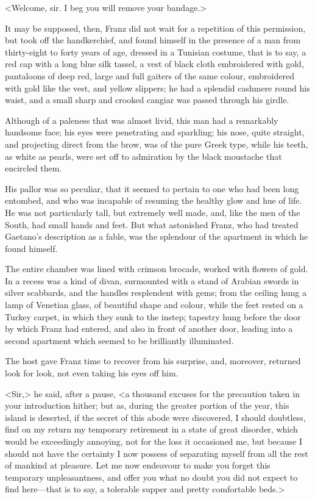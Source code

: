  <Welcome, sir. I beg you will remove your bandage.> 

 It may be supposed, then, Franz did not wait for a repetition of this permission, but took off the handkerchief, and found himself in the presence of a man from thirty-eight to forty years of age, dressed in a Tunisian costume, that is to say, a red cap with a long blue silk tassel, a vest of black cloth embroidered with gold, pantaloons of deep red, large and full gaiters of the same colour, embroidered with gold like the vest, and yellow slippers; he had a splendid cashmere round his waist, and a small sharp and crooked cangiar was passed through his girdle. 

 Although of a paleness that was almost livid, this man had a remarkably handsome face; his eyes were penetrating and sparkling; his nose, quite straight, and projecting direct from the brow, was of the pure Greek type, while his teeth, as white as pearls, were set off to admiration by the black moustache that encircled them. 

 His pallor was so peculiar, that it seemed to pertain to one who had been long entombed, and who was incapable of resuming the healthy glow and hue of life. He was not particularly tall, but extremely well made, and, like the men of the South, had small hands and feet. But what astonished Franz, who had treated Gaetano's description as a fable, was the splendour of the apartment in which he found himself. 

 The entire chamber was lined with crimson brocade, worked with flowers of gold. In a recess was a kind of divan, surmounted with a stand of Arabian swords in silver scabbards, and the handles resplendent with gems; from the ceiling hung a lamp of Venetian glass, of beautiful shape and colour, while the feet rested on a Turkey carpet, in which they sunk to the instep; tapestry hung before the door by which Franz had entered, and also in front of another door, leading into a second apartment which seemed to be brilliantly illuminated. 

 The host gave Franz time to recover from his surprise, and, moreover, returned look for look, not even taking his eyes off him. 

 <Sir,> he said, after a pause, <a thousand excuses for the precaution taken in your introduction hither; but as, during the greater portion of the year, this island is deserted, if the secret of this abode were discovered, I should doubtless, find on my return my temporary retirement in a state of great disorder, which would be exceedingly annoying, not for the loss it occasioned me, but because I should not have the certainty I now possess of separating myself from all the rest of mankind at pleasure. Let me now endeavour to make you forget this temporary unpleasantness, and offer you what no doubt you did not expect to find here—that is to say, a tolerable supper and pretty comfortable beds.> 

